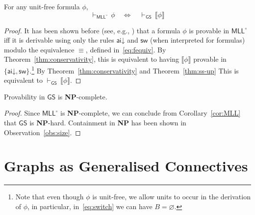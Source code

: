 \documentclass{lmcs} %
\newcommand{\proves}[2][]{\mathord{\vdash_{#1}\,}{#2}}
\renewcommand{\emptyset}{\varnothing}
\def\GS{\mathsf{GS}}
\newcommand{\fequiv}{\equiv}
\newcommand{\quiff}{\quad\iff\quad}
\def\aidr{\dairule}
\def\set#1{\{#1\}}
\def\airule{\mathsf{ai}}
\def\dairule{\airule\mathord{\downarrow}}
\def\swir{\mathsf{sw}}
\def\MLLm{\mathsf{MLL^\circ}}
\newcommand{\graphof}[1]{\llbracket#1\rrbracket}
\theoremstyle{plain}
\begin{document}
\begin{cor}\label{cor:MLL}
  For any unit-free formula $\phi$,
  \begin{equation*}
    \proves[\MLLm] \phi \quiff \proves[\GS] {\graphof{\phi}}
  \end{equation*}
\end{cor}

\begin{proof}
  It has been shown before (see, e.g., \cite{gug:str:01,dissvonlutz})
  that a formula $\phi$ is provable in $\MLLm$ iff it is derivable
  using only the rules $\aidr$ and $\swir$ (when interpreted for
  formulas) modulo the equivalence $\fequiv$, defined
  in~\eqref{eq:fequiv}. By Theorem~\ref{thm:conservativity}, this is
  equivalent to having $\graphof{\phi}$ provable in
  $\set{\aidr,\swir}$.\footnote{Note that even though $\phi$ is
    unit-free, we allow units to occur in the derivation of $\phi$,
    in particular, in~\eqref{eq:switch} we can have $B=\emptyset$.}
  By Theorem~\ref{thm:conservativity} and Theorem~\ref{thm:ss-up}
  This is equivalent to $\proves[\GS] {\graphof{\phi}}$.
\end{proof}

\begin{cor}\label{cor:NP}
  Provability in $\GS$ is {\bf NP}-complete. 
\end{cor}

\begin{proof}
  Since $\MLLm$ is {\bf NP}-complete, we can conclude from
  Corollary~\ref{cor:MLL} that $\GS$ is {\bf NP}-hard. Containment in
  {\bf NP} has been shown in Observation~\ref{obs:size}.
\end{proof}











\section{Graphs as  Generalised Connectives}\label{sec:generalised}
\end{document}
